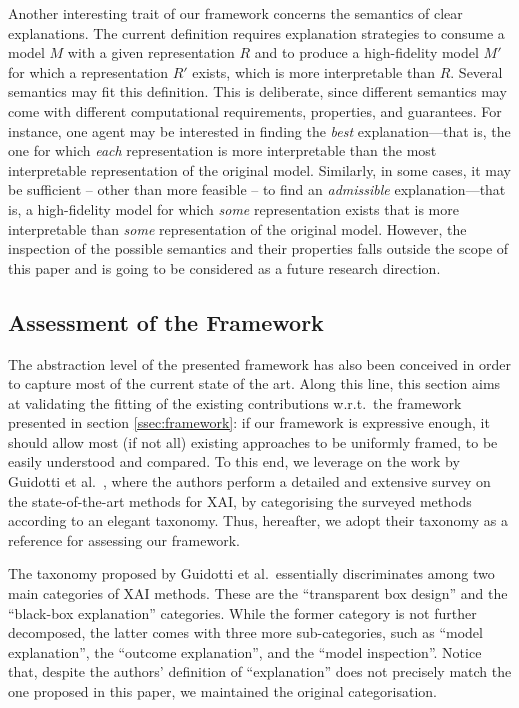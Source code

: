 \documentclass[12pt,a4paper,openright,twoside]{book}
\begin{document}
Another interesting trait of our framework concerns the semantics of clear explanations.
%
The current definition requires explanation strategies to consume a model $M$ with a given representation $R$ and to produce a high-fidelity model $M'$ for which a representation $R'$ exists, which is more interpretable than $R$.
%
Several semantics may fit this definition.
%
This is deliberate, since different semantics may come with different computational requirements, properties, and guarantees.
%
For instance, one agent may be interested in finding the \emph{best} explanation---that is, the one for which \emph{each} representation is more interpretable than the most interpretable representation of the original model.
%
Similarly, in some cases, it may be sufficient -- other than more feasible -- to find an \emph{admissible} explanation---that is, a high-fidelity model for which \emph{some} representation exists that is more interpretable than \emph{some} representation of the original model.
%
However, the inspection of the possible semantics and their properties falls outside the scope of this paper and is going to be considered as a future research direction.

\subsection{Assessment of the Framework}\label{sec:validation}

The abstraction level of the presented framework has also been conceived in order to capture most of the current state of the art.
%
Along this line, this section aims at validating the fitting of the existing contributions w.r.t.\ the framework presented in section \cref{ssec:framework}: if our framework is expressive enough, it should allow most (if not all) existing approaches to be uniformly framed, to be easily understood and compared.
%
To this end, we leverage on the work by Guidotti et al.\ \cite{GuidottiMRTGP19}, where the authors perform a detailed and extensive survey on the state-of-the-art methods for XAI, by categorising the surveyed methods according to an elegant taxonomy.
%
Thus, hereafter, we adopt their taxonomy as a reference for assessing our framework.

The taxonomy proposed by Guidotti et al.\ essentially discriminates among two main categories of XAI methods.
%
These are the ``transparent box design'' and the ``black-box explanation'' categories.
%
While the former category is not further decomposed, the latter comes with three more sub-categories, such as ``model explanation'', the ``outcome explanation'', and the ``model inspection''.
%
Notice that, despite the authors' definition of ``explanation'' does not precisely match the one proposed in this paper, we maintained the original categorisation.
\end{document}
